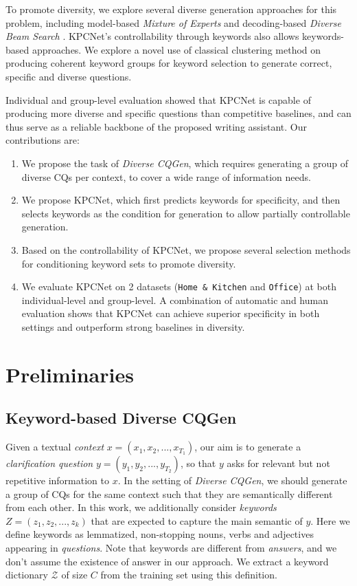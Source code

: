 \documentclass[letterpaper]{article} %
\begin{document}
To promote diversity, we explore several diverse generation approaches for this problem, including model-based \textit{Mixture of Experts} \citep{shen2019mixture} and decoding-based \textit{Diverse Beam Search} \citep{vijayakumar2018diverse}. KPCNet's controllability through keywords also allows keywords-based approaches. We explore a novel use of classical clustering method on producing coherent keyword groups for keyword selection to generate correct, specific and diverse questions.

Individual and group-level evaluation showed that KPCNet is capable of producing more diverse and specific questions than competitive baselines, and can thus serve as a reliable backbone of the proposed writing assistant. Our contributions are:

\begin{enumerate}
  \item We propose the task of \textit{Diverse CQGen}, which requires generating a group of diverse CQs per context, to cover a wide range of information needs. 
  \item We propose KPCNet, which first predicts keywords for specificity, and then selects keywords as the condition for generation to allow partially controllable generation.
  \item Based on the controllability of KPCNet, we propose several selection methods for conditioning keyword sets to promote diversity.
  \item We evaluate KPCNet on 2 datasets (\texttt{Home \& Kitchen} and \texttt{Office}) at both individual-level and group-level. A combination of automatic and human evaluation shows that KPCNet can achieve superior specificity in both settings and outperform strong baselines in diversity.
\end{enumerate}

\section{Preliminaries}

\subsection{Keyword-based Diverse CQGen}
Given a textual \textit{context} $x = (x_1, x_2, ..., x_{T_1})$, our aim is to generate a \textit{clarification question} $y = (y_1, y_2, ..., y_{T_2})$, so that $y$ asks for relevant but not repetitive information to $x$. In the setting of \textit{Diverse CQGen}, we should generate a group of CQs for the same context such that they are semantically different from each other. In this work, we additionally consider \textit{keywords} $Z = (z_1, z_2, ..., z_k)$ that are expected to capture the main semantic of $y$. Here we define keywords as lemmatized, non-stopping nouns, verbs and adjectives appearing in \textit{questions}. Note that keywords are different from \textit{answers}, and we don't assume the existence of answer in our approach. We extract a keyword dictionary $\mathcal{Z}$ of size $C$ from the training set using this definition. 
\end{document}
